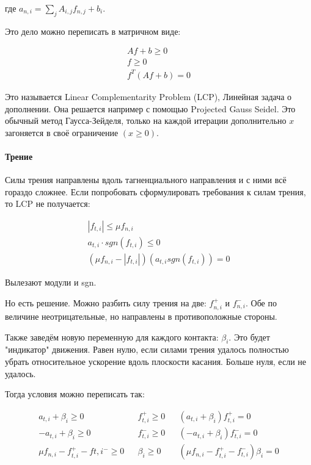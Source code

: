 \documentclass[14pt,russian]{extarticle}
\begin{document}
где $a_{n,i} = \sum_j A_{i,j} f_{n,j} + b_i$.

Это дело можно переписать в матричном виде:

\[
\begin{matrix}
    Af + b \ge 0 \\
    f \ge 0 \\
    f^T (Af + b) = 0
\end{matrix}
\]

Это называется Linear Complementarity Problem (LCP), Линейная задача о дополнении.
Она решается например с помощью Projected Gauss Seidel. Это обычный метод Гаусса-Зейделя,
только на каждой итерации дополнительно $x$ загоняется в своё ограничение $(x \ge 0)$.

\paragraph{Трение}

Силы трения направлены вдоль тагненциального направления и с ними всё гораздо сложнее.
Если попробовать сформулировать требования к силам трения, то LCP не получается:

\[
\begin{matrix}
    |f_{t,i}| \le \mu f_{n,i} \\
    a_{t,i} \cdot sgn(f_{t,i}) \le 0 \\
    (\mu f_{n,i} - |f_{t,i}|) (a_{t,i} sgn(f_{t,i})) = 0
\end{matrix}
\]

Вылезают модули и sgn.

Но есть решение. Можно разбить силу трения на две: $f_{n,i}^+$ и $f_{n,i}^-$.
Обе по величине неотрицательные, но направлены в противоположные стороны.

Также заведём новую переменную для каждого контакта: $\beta_i$.
Это будет "индикатор" движения. Равен нулю, если силами трения удалось полностью убрать относительное ускорение вдоль плоскости касания.
Больше нуля, если не удалось.

Тогда условия можно переписать так:

\[
\begin{matrix}
    a_{t,i} + \beta_i \ge 0 && f_{t,i}^+ \ge 0 && (a_{t,i} + \beta_i) f_{t,i}^+ = 0 \\
    -a_{t,i} + \beta_i \ge 0 && f_{t,i}^- \ge 0 && (-a_{t,i} + \beta_i) f_{t,i}^- = 0 \\
    \mu f_{n,i} - f_{t,i}^+ - f{t,i}^- \ge 0 && \beta_i \ge 0 && (\mu f_{n,i} - f_{t,i}^+ - f_{t,i}^-) \beta_i = 0
\end{matrix}
\]
\end{document}
